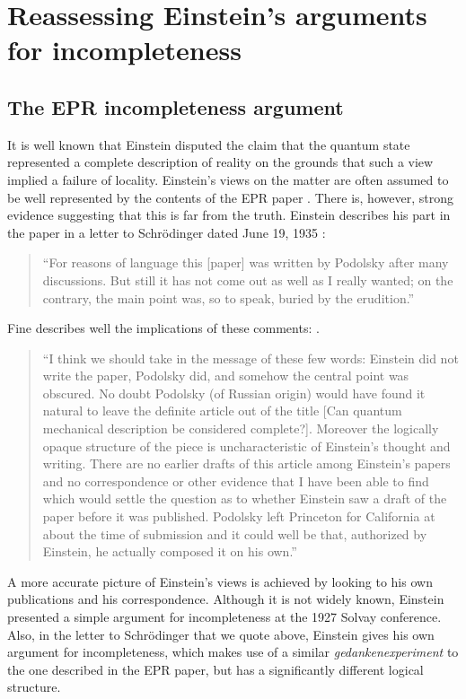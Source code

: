 \documentclass[aps,nofootinbib,12pt]{revtex4}
\begin{document}
\section{Reassessing Einstein's arguments for incompleteness \label{SEC:historical}}

\subsection{The EPR incompleteness argument}

It is well known that Einstein disputed the claim that the quantum
state represented a complete description of reality on the grounds
that such a view implied a failure of locality. Einstein's views on
the matter are often assumed to be well represented by the contents
of the EPR paper \cite{EPR}. There is, however, strong evidence
suggesting that this is far from the truth. Einstein describes his
part in the paper in a letter to Schr\"{o}dinger dated June 19, 1935
\cite{EtoS1935}:
\begin{quote}
``For reasons of language this [paper] was written by Podolsky after
many discussions. But still it has not come out as well as I really
wanted; on the contrary, the main point was, so to speak, buried by
the erudition.''
\end{quote}
Fine describes well the implications of these comments:
\cite{FineEcritique}.
\begin{quote}
``I think we should take in the message of these few words: Einstein did not
write the paper, Podolsky did, and somehow the central point was obscured. No
doubt Podolsky (of Russian origin) would have found it natural to leave the
definite article out of the title [Can quantum mechanical description be
considered complete?]. Moreover the logically opaque structure of the piece is
uncharacteristic of Einstein's thought and writing. There are no earlier
drafts of this article among Einstein's papers and no correspondence or other
evidence that I have been able to find which would settle the question as to
whether Einstein saw a draft of the paper before it was published. Podolsky
left Princeton for California at about the time of submission and it could
well be that, authorized by Einstein, he actually composed it on his own.''
\end{quote}

A more accurate picture of Einstein's views is achieved by looking
to his own publications and his correspondence. Although it is not
widely known, Einstein presented a simple argument for
incompleteness at the 1927 Solvay conference. Also, in the letter to
Schr\"{o}dinger that we quote above, Einstein gives his own argument
for incompleteness, which makes use of a similar
\textit{gedankenexperiment} to the one described in the EPR paper,
but has a significantly different logical structure.
\end{document}
